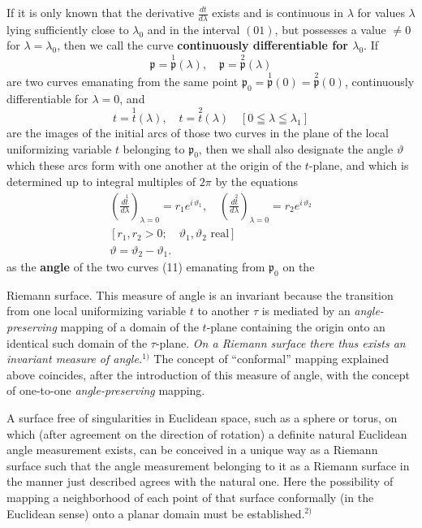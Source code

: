 \documentclass{article}
\begin{document}
If it is only known that the derivative $\frac{dt}{d\lambda}$ exists and is continuous in $\lambda$ for values $\lambda$ lying sufficiently close to $\lambda_0$ and in the interval $(01)$, but possesses a value $\neq 0$ for $\lambda = \lambda_0$, then we call the curve \textbf{continuously differentiable for $\lambda_0$}. If
\[ \mathfrak{p} = \overset{1}{\mathfrak{p}}(\lambda), \quad \mathfrak{p} = \overset{2}{\mathfrak{p}}(\lambda) \tag{11} \]
are two curves emanating from the same point $\mathfrak{p}_0 = \overset{1}{\mathfrak{p}}(0) = \overset{2}{\mathfrak{p}}(0)$, continuously differentiable for $\lambda = 0$, and
\[ t = \overset{1}{t}(\lambda), \quad t = \overset{2}{t}(\lambda) \quad [0 \leqq \lambda \leqq \lambda_1] \]
are the images of the initial arcs of those two curves in the plane of the local uniformizing variable $t$ belonging to $\mathfrak{p}_0$, then we shall also designate the angle $\vartheta$ which these arcs form with one another at the origin of the $t$-plane, and which is determined up to integral multiples of $2\pi$ by the equations
\[ \begin{gathered}
\left(\frac{d\overset{1}{t}}{d\lambda}\right)_{\lambda = 0} = r_1 e^{i\,\vartheta_1}, \quad \left(\frac{d\overset{2}{t}}{d\lambda}\right)_{\lambda = 0} = r_2 e^{i\,\vartheta_2} \\
[r_1, r_2 > 0; \quad \vartheta_1, \vartheta_2 \text{ real}] \\
\vartheta = \vartheta_2 - \vartheta_1.
\end{gathered} \]
as the \textbf{angle} of the two curves (11) emanating from $\mathfrak{p}_0$ on the

Riemann surface. This measure of angle is an invariant because the transition from one local uniformizing variable $t$ to another $\tau$ is mediated by an \emph{angle-preserving} mapping of a domain of the $t$-plane containing the origin onto an identical such domain of the $\tau$-plane. \emph{On a Riemann surface there thus exists an invariant measure of angle.}${}^{1)}$ The concept of ``conformal'' mapping explained above coincides, after the introduction of this measure of angle, with the concept of one-to-one \emph{angle-preserving} mapping.

A surface free of singularities in Euclidean space, such as a sphere or torus, on which (after agreement on the direction of rotation) a definite natural Euclidean angle measurement exists, can be conceived in a unique way as a Riemann surface such that the angle measurement belonging to it as a Riemann surface in the manner just described agrees with the natural one. Here the possibility of mapping a neighborhood of each point of that surface conformally (in the Euclidean sense) onto a planar domain must be established.${}^{2)}$
\end{document}
